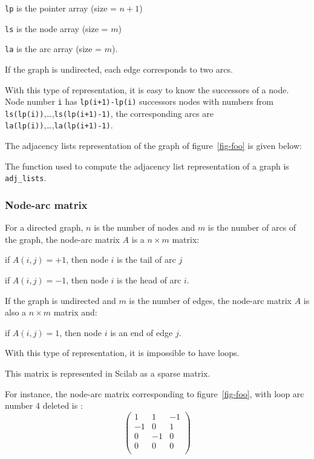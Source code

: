 \documentclass[11pt]{article}
\newcommand{\func}[1]{\texttt{#1}}
\begin{document}
\texttt{lp} is the pointer  array  (size = $n+1$)

\texttt{ls} is the node array (size = $m$)

\texttt{la} is the arc array (size = $m$).

If the graph is undirected, each edge corresponds to two arcs.

With this type of representation, it is easy to know the successors of
a node. Node number \texttt{i} has \texttt{lp(i+1)-lp(i)} successors
nodes with numbers from
\texttt{ls(lp(i))},\ldots,\texttt{ls(lp(i+1)-1)},
the corresponding arcs are 
\texttt{la(lp(i))},\ldots,\texttt{la(lp(i+1)-1)}.

The adjacency lists representation of the graph of figure~\ref{fig-foo}
is given below:

\begin{center}

\end{center}

The function used to compute the adjacency list
representation of a graph is \func{adj\_lists}.

\subsubsection{Node-arc matrix}

For a directed graph,
$n$ is the number of nodes and $m$ is the number of arcs of the
graph, the node-arc matrix $A$ is a $n\times m$ matrix:

if $A(i,j)=+1$, then node $i$ is the tail of arc $j$

if $A(i,j)=-1$, then node $i$ is the head of arc $i$.

If the graph is undirected and $m$ is the number of edges, 
the node-arc matrix $A$ is also a $n\times m$ matrix and:

if $A(i,j)=1$, then node $i$ is an end of edge $j$.

With this type of representation, it is impossible to have loops.

This matrix is represented in Scilab as a sparse matrix.

For instance, the node-arc matrix corresponding to figure~\ref{fig-foo},
with loop arc number 4 deleted is :
\[\left(\begin{array}{cccc}
 1 &  1 & -1 \\
-1 &  0 &  1 \\
 0 & -1 &  0 \\
 0 &  0 &  0 \\
\end{array}\right)\]
\end{document}
